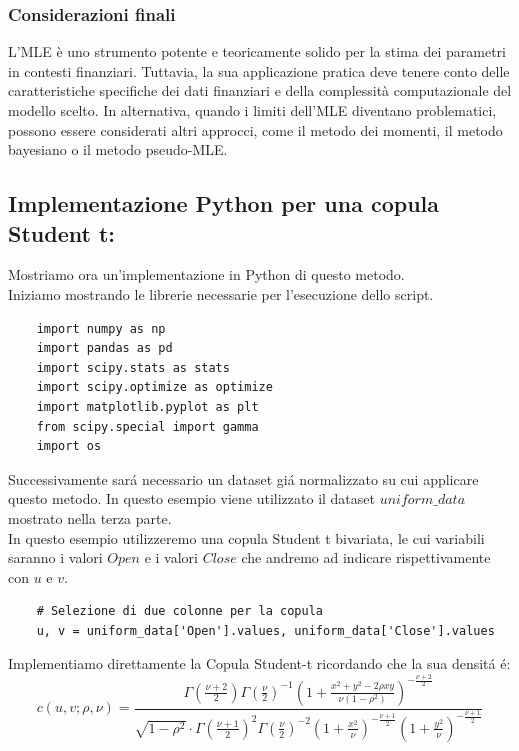 \documentclass[%
	corpo=11pt,
    twoside,
    stile=classica,
    oldstyle,
    tipotesi=custom,
    greek,
    evenboxes,
]{toptesi}
\begin{document}
\subsubsection{Considerazioni finali}

L'MLE è uno strumento potente e teoricamente solido per la stima dei parametri in contesti finanziari. Tuttavia, la sua applicazione pratica deve tenere conto delle caratteristiche specifiche dei dati finanziari e della complessità computazionale del modello scelto. In alternativa, quando i limiti dell'MLE diventano problematici, possono essere considerati altri approcci, come il metodo dei momenti, il metodo bayesiano o il metodo pseudo-MLE.\\

\subsection{Implementazione Python per una copula Student t:}
Mostriamo ora un'implementazione in Python di questo metodo.\\
Iniziamo mostrando le librerie necessarie per l'esecuzione dello script.
\begin{Verbatim}
	import numpy as np
	import pandas as pd
	import scipy.stats as stats
	import scipy.optimize as optimize
	import matplotlib.pyplot as plt
	from scipy.special import gamma
	import os
\end{Verbatim}
Successivamente sará necessario un dataset giá normalizzato su cui applicare questo metodo. In questo esempio viene utilizzato il dataset $uniform\_data$ mostrato nella terza parte.\\
In questo esempio utilizzeremo una copula Student t bivariata, le cui variabili saranno i valori $Open$ e i valori $Close$ che andremo ad indicare rispettivamente con $u$ e $v$.\\
\begin{Verbatim}
	# Selezione di due colonne per la copula
	u, v = uniform_data['Open'].values, uniform_data['Close'].values
\end{Verbatim}
Implementiamo direttamente la Copula Student-t ricordando che la sua densitá é:\\
\[
c(u,v; \rho, \nu) =
\frac{\Gamma\left(\frac{\nu+2}{2}\right) \Gamma\left(\frac{\nu}{2}\right)^{-1} \left(1 + \frac{x^2 + y^2 - 2\rho xy}{\nu(1 - \rho^2)}\right)^{-\frac{\nu+2}{2}}}
{\sqrt{1 - \rho^2} \cdot \Gamma\left(\frac{\nu+1}{2}\right)^2 \Gamma\left(\frac{\nu}{2}\right)^{-2} \left(1 + \frac{x^2}{\nu}\right)^{-\frac{\nu+1}{2}} \left(1 + \frac{y^2}{\nu}\right)^{-\frac{\nu+1}{2}}}
\]
\end{document}
